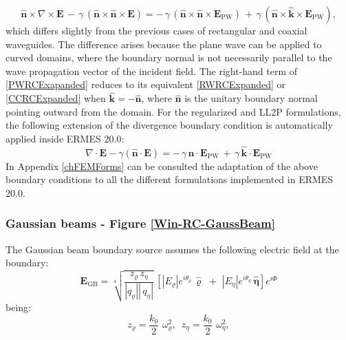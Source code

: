 \begin{equation}\label{PWRCExapanded}
	\mathbf{\hat{n}}\times\nabla\times\mathbf{E}\, - \,\gamma\,(\mathbf{\hat{n}}\times\mathbf{\hat{n}}\times\mathbf{E}) = - \,\gamma\,(\mathbf{\hat{n}}\times\mathbf{\hat{n}}\times\mathbf{E}_{\text{PW}})\, + \,\gamma\,(\mathbf{\hat{n}}\times\mathbf{\hat{k}}\times\mathbf{E}_{\text{PW}}),
\end{equation}
which differs slightly from the previous cases of rectangular and coaxial waveguides. The difference arises because the plane wave can be applied to curved domains, where the boundary normal is not necessarily parallel to the wave propagation vector of the incident field. The right-hand term of \eqref{PWRCExapanded} reduces to its equivalent \eqref{RWRCExpanded} or \eqref{CCRCExpanded} when $\mathbf{\hat{k}} = -\mathbf{\hat{n}}$, where $\mathbf{\hat{n}}$ is the unitary boundary normal pointing outward from the domain. For the regularized and LL2P formulations, the following extension of the divergence boundary condition is automatically applied inside ERMES 20.0:
\begin{equation}\label{PWRCDivExapanded}
	\nabla\cdot\mathbf{E} - \gamma\left(\mathbf{\hat{n}}\cdot\mathbf{E}\right) = -\,\gamma\, \mathbf{\hat{n}}\cdot\mathbf{E}_{\text{PW}}\, + \,\gamma\,\mathbf{\hat{k}}\cdot\mathbf{E}_{\text{PW}}
\end{equation}
In Appendix \ref{chFEMForms} can be consulted the adaptation of the above boundary conditions to all the different formulations implemented in ERMES 20.0.

\subsubsection{Gaussian beams - Figure \ref{Win-RC-GaussBeam}}\label{bsGaussBeam}

The Gaussian beam boundary source assumes the following electric field at the boundary:
\begin{equation}\label{EGB}
	\mathbf{E}_{\text{GB}} = \sqrt[4]{\frac{z_{\varrho}\,z_{\eta}}{|q_{\varrho}||\,q_{\eta}|}}\,\left[|E_{\varrho}|e^{i\theta_{\varrho}}\,\mathbf{\hat{\varrho}}\,\,+\,\,|E_{\eta}|e^{i\theta_{\eta}}\,\mathbf{\hat{\eta}}\right]e^{i\Phi}
\end{equation}
being:
\begin{equation}\label{EGB-zs}
    z_{\varrho} = \dfrac{k_{0}}{2}\,\,\omega^{2}_{\varrho}, \,\,\, z_{\eta} = \dfrac{k_{0}}{2}\,\,\omega^{2}_{\eta},
\end{equation}

